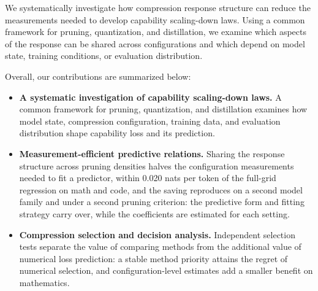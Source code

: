 We systematically investigate how compression response structure can reduce the measurements needed to develop capability scaling-down laws. Using a common framework for pruning, quantization, and distillation, we examine which aspects of the response can be shared across configurations and which depend on model state, training conditions, or evaluation distribution. 

Overall, our contributions are summarized below:
\begin{itemize}
\item \textbf{A systematic investigation of capability scaling-down laws.} A common framework for pruning, quantization, and distillation examines how model state, compression configuration, training data, and evaluation distribution shape capability loss and its prediction.
\item \textbf{Measurement-efficient predictive relations.} Sharing the response structure across pruning densities halves the configuration measurements needed to fit a predictor, within 0.020 nats per token of the full-grid regression on math and code, and the saving reproduces on a second model family and under a second pruning criterion: the predictive form and fitting strategy carry over, while the coefficients are estimated for each setting.
\item \textbf{Compression selection and decision analysis.} Independent selection tests separate the value of comparing methods from the additional value of numerical loss prediction:  a stable method priority  attains the regret of numerical selection, and configuration-level estimates add a smaller benefit on mathematics.
\end{itemize}


